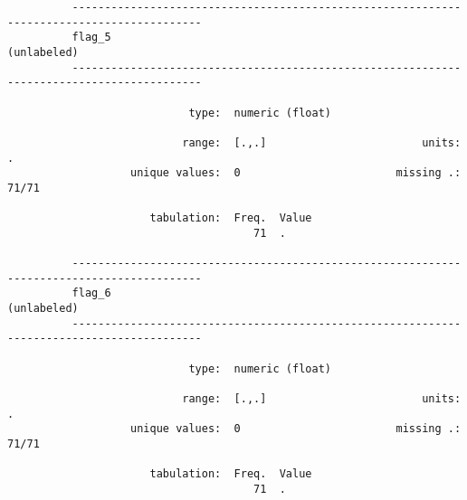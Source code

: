 \documentclass{article}
\begin{document}
\begin{verbatim}
          ------------------------------------------------------------------------------------------
          flag_5                                                                         (unlabeled)
          ------------------------------------------------------------------------------------------
          
                            type:  numeric (float)
          
                           range:  [.,.]                        units:  .
                   unique values:  0                        missing .:  71/71
          
                      tabulation:  Freq.  Value
                                      71  .
          
          ------------------------------------------------------------------------------------------
          flag_6                                                                         (unlabeled)
          ------------------------------------------------------------------------------------------
          
                            type:  numeric (float)
          
                           range:  [.,.]                        units:  .
                   unique values:  0                        missing .:  71/71
          
                      tabulation:  Freq.  Value
                                      71  .
          
          
          
          
          
          
\end{verbatim}
\end{document}
